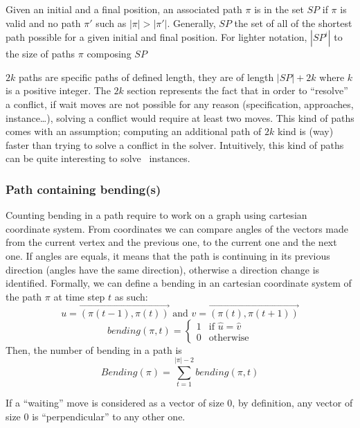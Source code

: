 \begin{definition}\label{def:shortest_path}
  Given an initial and a final position, an associated path \(\pi\) is in the set \(SP\) if \(\pi\) is valid and no path \(\pi'\) such as \(|\pi| > |\pi'|\). Generally, \(SP\) the set of all of the shortest path possible for a given initial and final position. For lighter notation, \(|SP^i|\) to the size of  paths \(\pi\) composing \(SP\)
\end{definition}



\(2k\) paths are specific paths of defined length, they are of length \(|SP| + 2k\) where \(k\) is a positive integer. The \(2k\) section represents the fact that in order to ``resolve'' a conflict, if wait moves are not possible for any reason (specification, approaches, instance\ldots), solving a conflict would require at least two moves. This kind of paths comes with an assumption; computing an additional path of \(2k\) kind is (way) faster than trying to solve a conflict in the solver. Intuitively, this kind of paths can be quite interesting to solve~ instances.





\subsubsection{Path containing bending(s)}

Counting bending in a path require to work on a graph using cartesian coordinate system. From coordinates we can compare angles of the vectors made from the current vertex and the previous one, to the current one and the next one. If angles are equals, it means that the path is continuing in its previous direction (angles have the same direction), otherwise a direction change is identified. Formally, we can define a bending in an cartesian coordinate system of the path \(\pi\) at time step \(t\) as such: \[
 u = \overrightarrow{(\pi(t-1),\pi(t))} \text{ and  } v = \overrightarrow{(\pi(t),\pi(t+1))}
\]
\[
  bending(\pi,t) = 
    \begin{cases}
      1  & \text{if }  \widehat{u} = \widehat{v} \\
      0  & \text{otherwise}
    \end{cases}  
\] Then, the number of bending in a path is \[
  Bending(\pi) =  \sum_{t=1}^{|\pi|-2}{bending(\pi,t)}
\] 

If a ``waiting'' move is considered as a vector of size 0, by definition, any vector of size 0 is ``perpendicular'' to any other one.

